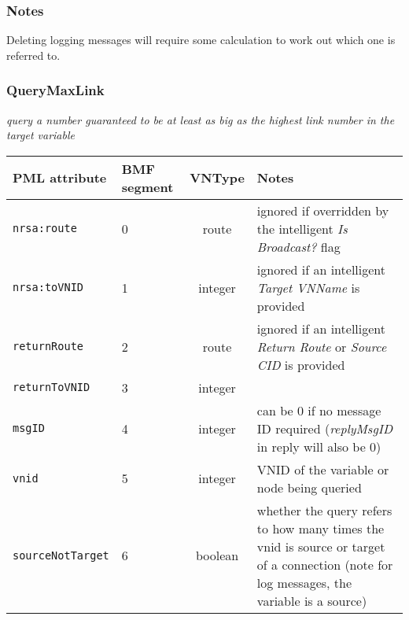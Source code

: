\documentclass[pdftex,a4paper]{article}
\newcommand{\XMLfont}[1]{{\tt \small #1}}
\begin{document}
\subsubsection*{Notes}

Deleting logging messages will require some calculation to work out
which one is referred to.

\clearpage

\subsubsection{QueryMaxLink}

{\em query a number guaranteed to be at least as big as the highest link
  number in the target variable}

\begin{table}[!h]
  \begin{center}
    \label{tab:QueryMaxLink}
    \begin{tabular}{|l|p{13mm}|c|p{60mm}|}
      \hline

      \textbf{PML attribute} & \textbf{BMF segment} & \textbf{VNType}
      & \textbf{Notes} \\\hline

      \XMLfont{nrsa:route} & 0 & route & ignored if overridden by the
      intelligent {\em Is Broadcast?} flag \\\hline

      \XMLfont{nrsa:toVNID} & 1 & integer & ignored if an intelligent {\em
      Target VNName} is provided \\\hline

      \XMLfont{returnRoute} & 2 & route & ignored if an
      intelligent {\em Return Route} or {\em Source CID} is provided
      \\\hline

      \XMLfont{returnToVNID} & 3 & integer & \\\hline

      \XMLfont{msgID} & 4 & integer & can be 0 if no message ID
      required ({\em replyMsgID} in reply will also be 0) \\\hline

      \XMLfont{vnid} & 5 & integer & VNID of the variable or
      node being queried \\\hline

      \XMLfont{sourceNotTarget} & 6 & boolean & whether the query
      refers to how many times the vnid is source or target of a
      connection (note for log messages, the variable is a
      source)\\\hline

    \end{tabular}
  \end{center}
\end{table}
\end{document}
